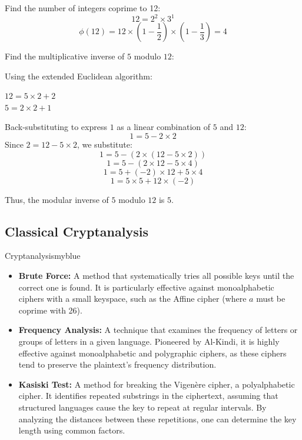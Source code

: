 Find the number of integers coprime to 12:  
\[
12 = 2^2 \times 3^1
\]
\[
\phi(12) = 12 \times \left(1 - \frac{1}{2}\right) \times \left(1 - \frac{1}{3}\right) = \boxed{4}
\]

\vspace{0.25cm}

Find the multiplicative inverse of \(5\) modulo \(12\):  

Using the extended Euclidean algorithm:  
\begin{center}
    \(12 = 5 \times 2 + 2\)\\[0.1cm]
    \(5 = 2 \times 2 + \boxed{1}\)\\[0.1cm]
\end{center}

Back-substituting to express \(1\) as a linear combination of \(5\) and \(12\):  
\[
1 = 5 - 2 \times 2
\]
Since \(2 = 12 - 5 \times 2\), we substitute:  
\[
1 = 5 - (2 \times (12 - 5 \times 2))
\]
\[
1 = 5 - (2 \times 12 - 5 \times 4)
\]
\[
1 = 5 + (-2) \times 12 + 5 \times 4
\]
\[
1 = 5 \times \boxed{5} + 12 \times (-2)
\]

Thus, the modular inverse of \(5\) modulo \(12\) is \(\boxed{5}\).

\newpage

\subsection{Classical Cryptanalysis}  

\begin{prettyBox}{Cryptanalysis}{myblue}  
\begin{itemize}  
    \item \textbf{Brute Force:} A method that systematically tries all possible keys until  
          the correct one is found. It is particularly effective against monoalphabetic  
          ciphers with a small keyspace, such as the Affine cipher (where \( a \) must be  
          coprime with 26).  
    \item \textbf{Frequency Analysis:} A technique that examines the frequency of letters  
          or groups of letters in a given language. Pioneered by Al-Kindi, it is highly  
          effective against monoalphabetic and polygraphic ciphers, as these ciphers tend  
          to preserve the plaintext’s frequency distribution.  
    \item \textbf{Kasiski Test:} A method for breaking the Vigenère cipher, a polyalphabetic  
          cipher. It identifies repeated substrings in the ciphertext, assuming that structured  
          languages cause the key to repeat at regular intervals. By analyzing the distances  
          between these repetitions, one can determine the key length using common factors.  
\end{itemize}  
\end{prettyBox}  

